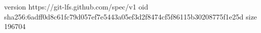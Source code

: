 version https://git-lfs.github.com/spec/v1
oid sha256:6adff0d8c61fc79d057ef7e5443a05ef3d2f8474cf5f86115b30208775f1e25d
size 196704
